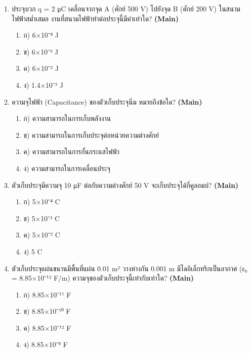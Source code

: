 \documentclass[12pt]{article}
\begin{document}
\begin{enumerate}[label=\arabic*.]
\begin{enumerate}[label=)]
\item ก) 9×10³ V
\item ข) 1.8×10⁴ V
\item ค) 4.5×10³ V
\item ง) 3.6×10⁴ V
\end{enumerate}
\item ประจุบวก q = 2 μC เคลื่อนจากจุด A (ศักย์ 500 V) ไปยังจุด B (ศักย์ 200 V) ในสนามไฟฟ้าสม่ำเสมอ งานที่สนามไฟฟ้าทำต่อประจุนี้มีค่าเท่าใด? \hfill \textbf{\small (Main)}
\begin{enumerate}[label=)]
\item ก) 6×10⁻⁴ J
\item ข) 6×10⁻³ J
\item ค) 6×10⁻² J
\item ง) 1.4×10⁻³ J
\end{enumerate}
\item ความจุไฟฟ้า (Capacitance) ของตัวเก็บประจุนิ่ม หมายถึงข้อใด? \hfill \textbf{\small (Main)}
\begin{enumerate}[label=)]
\item ก) ความสามารถในการเก็บพลังงาน
\item ข) ความสามารถในการเก็บประจุต่อหน่วยความต่างศักย์
\item ค) ความสามารถในการกั้นกระแสไฟฟ้า
\item ง) ความสามารถในการเคลื่อนประจุ
\end{enumerate}
\item ตัวเก็บประจุมีความจุ 10 μF ต่อกับความต่างศักย์ 50 V จะเก็บประจุได้กี่คูลอมบ์? \hfill \textbf{\small (Main)}
\begin{enumerate}[label=)]
\item ก) 5×10⁻⁴ C
\item ข) 5×10⁻³ C
\item ค) 5×10⁻² C
\item ง) 5 C
\end{enumerate}
\item ตัวเก็บประจุแผ่นขนานมีพื้นที่แผ่น 0.01 m² วางห่างกัน 0.001 m มีไดอิเล็กทริกเป็นอากาศ (ε₀ = 8.85×10⁻¹² F/m) ความจุของตัวเก็บประจุนี้เท่ากับเท่าใด? \hfill \textbf{\small (Main)}
\begin{enumerate}[label=)]
\item ก) 8.85×10⁻¹¹ F
\item ข) 8.85×10⁻¹⁰ F
\item ค) 8.85×10⁻¹² F
\item ง) 8.85×10⁻⁹ F
\end{enumerate}

\end{enumerate}
\end{document}
